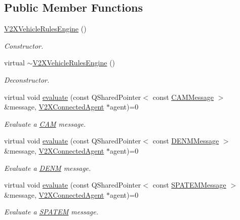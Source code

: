\subsection*{Public Member Functions}
\begin{DoxyCompactItemize}
\item 
\hyperlink{classV2XVehicleRulesEngine_afb79e1cfe25cb48cbcde113c0b2ceb7c}{V2\+X\+Vehicle\+Rules\+Engine} ()\hypertarget{classV2XVehicleRulesEngine_afb79e1cfe25cb48cbcde113c0b2ceb7c}{}\label{classV2XVehicleRulesEngine_afb79e1cfe25cb48cbcde113c0b2ceb7c}

\begin{DoxyCompactList}\small\item\em Constructor. \end{DoxyCompactList}\item 
virtual \hyperlink{classV2XVehicleRulesEngine_a2c339ab95ca518e7225d751d51fa0d23}{$\sim$\+V2\+X\+Vehicle\+Rules\+Engine} ()\hypertarget{classV2XVehicleRulesEngine_a2c339ab95ca518e7225d751d51fa0d23}{}\label{classV2XVehicleRulesEngine_a2c339ab95ca518e7225d751d51fa0d23}

\begin{DoxyCompactList}\small\item\em Deconstructor. \end{DoxyCompactList}\item 
virtual void \hyperlink{classV2XVehicleRulesEngine_aae22376954a23a4599514dd477812610}{evaluate} (const Q\+Shared\+Pointer$<$ const \hyperlink{classCAMMessage}{C\+A\+M\+Message} $>$ \&message, \hyperlink{classV2XConnectedAgent}{V2\+X\+Connected\+Agent} $\ast$agent)=0
\begin{DoxyCompactList}\small\item\em Evaluate a \hyperlink{structCAM}{C\+AM} message. \end{DoxyCompactList}\item 
virtual void \hyperlink{classV2XVehicleRulesEngine_a9e700eb9e9caa92ee8e9e9f0540c711b}{evaluate} (const Q\+Shared\+Pointer$<$ const \hyperlink{classDENMMessage}{D\+E\+N\+M\+Message} $>$ \&message, \hyperlink{classV2XConnectedAgent}{V2\+X\+Connected\+Agent} $\ast$agent)=0
\begin{DoxyCompactList}\small\item\em Evaluate a \hyperlink{structDENM}{D\+E\+NM} message. \end{DoxyCompactList}\item 
virtual void \hyperlink{classV2XVehicleRulesEngine_ad2e20104dcf7ae4fb8bcb4d66265e72a}{evaluate} (const Q\+Shared\+Pointer$<$ const \hyperlink{classSPATEMMessage}{S\+P\+A\+T\+E\+M\+Message} $>$ \&message, \hyperlink{classV2XConnectedAgent}{V2\+X\+Connected\+Agent} $\ast$agent)=0
\begin{DoxyCompactList}\small\item\em Evaluate a \hyperlink{structSPATEM}{S\+P\+A\+T\+EM} message. \end{DoxyCompactList}\end{DoxyCompactItemize}


